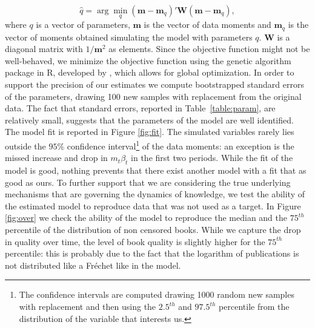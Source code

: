 \documentclass[12pt]{article}
\begin{document}
\begin{equation}
\hat{q}=\arg\min_{q} (\mathbf{m}-\mathbf{m}_q)'\mathbf{W}(\mathbf{m}-\mathbf{m}_q),
\end{equation}
where $q$ is a vector of parameters, $\mathbf{m}$ is the vector of data moments and  $\mathbf{m}_q$ is the vector of moments obtained simulating the model with parameters $q$. $\mathbf{W}$ is a diagonal matrix with $1/\mathbf{m}^2$ as elements. Since the objective function might not be well-behaved, we minimize the objective function using the genetic algorithm package in R, developed by , which allows for global optimization.
In order to support the precision of our estimates we compute bootstrapped standard errors of the parameters, drawing 100 new samples with replacement from the original data. The fact that standard errors, reported in Table~\ref{table:param}, are relatively small, suggests that the parameters of the model are well identified.
The model fit is reported in Figure \ref{fig:fit}. The simulated variables rarely lies outside the $95\%$ confidence interval\footnote{The confidence intervals are computed drawing 1000 random new samples with replacement and then using the $2.5^{th}$ and $97.5^{th}$ percentile from the distribution of the variable that interests us.} of the data moments: an exception is the missed increase and drop in $m_t \beta_t$ in the first two periods. While the fit of the model is good, nothing prevents that there exist another model with a fit that as good as ours. To further support that we are considering the true underlying mechanisms that are governing the dynamics of knowledge, we test the ability of the estimated model to reproduce data that was not used as a target. In Figure \ref{fig:over} we check the ability of the model to reproduce the median and the $75^{th}$ percentile of the distribution of non censored books. While we capture the drop in quality over time,  the level of book quality is slightly higher for the $75^{th}$ percentile: this is probably due to the fact that the logarithm of publications is not distributed like a Fréchet like in the model.



\end{document}
